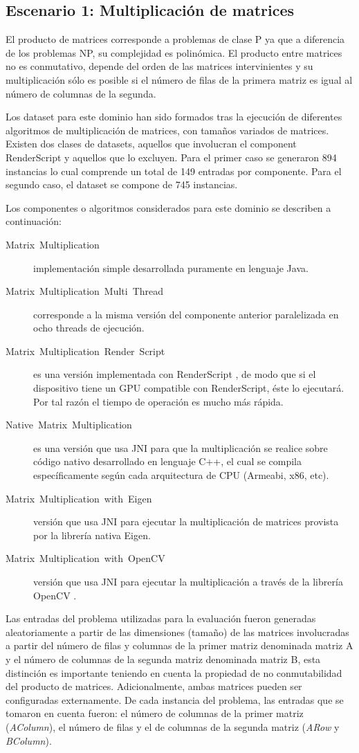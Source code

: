 \subsection{Escenario 1: Multiplicación de matrices\label{subsec:Escenario-4:-Multiplicaci=0000F3n}}

El producto de matrices corresponde a problemas de clase P ya que
a diferencia de los problemas NP, su complejidad es polinómica. El
producto entre matrices no es conmutativo, depende del orden de las
matrices intervinientes y su multiplicación sólo es posible si el
número de filas de la primera matriz es igual al número de columnas
de la segunda. 

Los dataset para este dominio han sido formados tras la ejecución
de diferentes algoritmos de multiplicación de matrices, con tamaños
variados de matrices. Existen dos clases de datasets, aquellos que
involucran el component RenderScript y aquellos que lo excluyen. Para
el primer caso se generaron 894 instancias lo cual comprende un total
de 149 entradas por componente. Para el segundo caso, el dataset se
compone de 745 instancias. 

Los componentes o algoritmos considerados para este dominio se describen
a continuación: 
\begin{description}
\item [{Matrix~Multiplication}] implementación simple desarrollada puramente
en lenguaje Java. 
\item [{Matrix~Multiplication~Multi~Thread}] corresponde a la misma
versión del componente anterior paralelizada en ocho threads de ejecución. 
\item [{Matrix~Multiplication~Render~Script}] es una versión implementada
con RenderScript , de modo que si el dispositivo tiene un \ac{GPU}
compatible con RenderScript, éste lo ejecutará. Por tal razón el tiempo
de operación es mucho más rápida. 
\item [{Native~Matrix~Multiplication}] es una versión que usa \ac{JNI}
para que la multiplicación se realice sobre código nativo desarrollado
en lenguaje C++, el cual se compila específicamente según cada arquitectura
de \ac{CPU} (Armeabi, x86, etc). 
\item [{Matrix~Multiplication~with~Eigen}] versión que usa \ac{JNI}
para ejecutar la multiplicación de matrices provista por la librería
nativa Eigen. 
\item [{Matrix~Multiplication~with~OpenCV}] versión que usa \ac{JNI}
para ejecutar la multiplicación a través de la librería OpenCV . 
\end{description}
Las entradas del problema utilizadas para la evaluación fueron generadas
aleatoriamente a partir de las dimensiones (tamaño) de las matrices
involucradas a partir del número de filas y columnas de la primer
matriz denominada matriz A y el número de columnas de la segunda matriz
denominada matriz B, esta distinción es importante teniendo en cuenta
la propiedad de no conmutabilidad del producto de matrices. Adicionalmente,
ambas matrices pueden ser configuradas externamente. De cada instancia
del problema, las entradas que se tomaron en cuenta fueron: el número
de columnas de la primer matriz (\emph{AColumn}), el número de filas
y el de columnas de la segunda matriz (\emph{ARow} y \emph{BColumn}).

